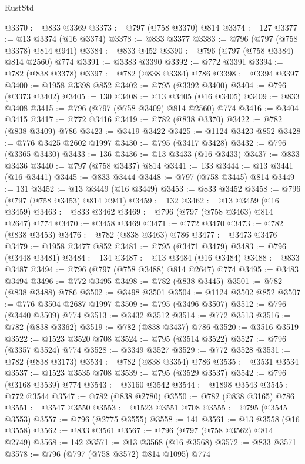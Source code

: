 \begin{lexlean}{RustStd}
\begin{coremodule}
@3370 := @833 @3369
@3373 := @797 (@758 @3370) @814
@3374 := 127
@3377 := @13 @3374 (@16 @3374)
@3378 := @833 @3377
@3383 := @796 (@797 (@758 @3378) @814 @941)
@3384 := @833 @452
@3390 := @796 (@797 (@758 @3384) @814 @2560) @774
@3391 := @3383 @3390
@3392 := @772 @3391
@3394 := @782 (@838 @3378)
@3397 := @782 (@838 @3384) @786
@3398 := @3394 @3397
@3400 := @1958 @3398 @852
@3402 := @795 (@3392 @3400)
@3404 := @796 (@3373 @3402)
@3405 := 130
@3408 := @13 @3405 (@16 @3405)
@3409 := @833 @3408
@3415 := @796 (@797 (@758 @3409) @814 @2560) @774
@3416 := @3404 @3415
@3417 := @772 @3416
@3419 := @782 (@838 @3370)
@3422 := @782 (@838 @3409) @786
@3423 := @3419 @3422
@3425 := @1124 @3423 @852
@3428 := @776 @3425 @2602 @1997
@3430 := @795 (@3417 @3428)
@3432 := @796 (@3365 @3430)
@3433 := 136
@3436 := @13 @3433 (@16 @3433)
@3437 := @833 @3436
@3440 := @797 (@758 @3437) @814
@3441 := 133
@3444 := @13 @3441 (@16 @3441)
@3445 := @833 @3444
@3448 := @797 (@758 @3445) @814
@3449 := 131
@3452 := @13 @3449 (@16 @3449)
@3453 := @833 @3452
@3458 := @796 (@797 (@758 @3453) @814 @941)
@3459 := 132
@3462 := @13 @3459 (@16 @3459)
@3463 := @833 @3462
@3469 := @796 (@797 (@758 @3463) @814 @2647) @774
@3470 := @3458 @3469
@3471 := @772 @3470
@3473 := @782 (@838 @3453)
@3476 := @782 (@838 @3463) @786
@3477 := @3473 @3476
@3479 := @1958 @3477 @852
@3481 := @795 (@3471 @3479)
@3483 := @796 (@3448 @3481)
@3484 := 134
@3487 := @13 @3484 (@16 @3484)
@3488 := @833 @3487
@3494 := @796 (@797 (@758 @3488) @814 @2647) @774
@3495 := @3483 @3494
@3496 := @772 @3495
@3498 := @782 (@838 @3445)
@3501 := @782 (@838 @3488) @786
@3502 := @3498 @3501
@3504 := @1124 @3502 @852
@3507 := @776 @3504 @2687 @1997
@3509 := @795 (@3496 @3507)
@3512 := @796 (@3440 @3509) @774
@3513 := @3432 @3512
@3514 := @772 @3513
@3516 := @782 (@838 @3362)
@3519 := @782 (@838 @3437) @786
@3520 := @3516 @3519
@3522 := @1523 @3520 @708
@3524 := @795 (@3514 @3522)
@3527 := @796 (@3357 @3524) @774
@3528 := @3349 @3527
@3529 := @772 @3528
@3531 := @782 (@838 @3173)
@3534 := @782 (@838 @3354) @786
@3535 := @3531 @3534
@3537 := @1523 @3535 @708
@3539 := @795 (@3529 @3537)
@3542 := @796 (@3168 @3539) @774
@3543 := @3160 @3542
@3544 := @1898 @3543
@3545 := @772 @3544
@3547 := @782 (@838 @2780)
@3550 := @782 (@838 @3165) @786
@3551 := @3547 @3550
@3553 := @1523 @3551 @708
@3555 := @795 (@3545 @3553)
@3557 := @796 (@2775 @3555)
@3558 := 141
@3561 := @13 @3558 (@16 @3558)
@3562 := @833 @3561
@3567 := @796 (@797 (@758 @3562) @814 @2749)
@3568 := 142
@3571 := @13 @3568 (@16 @3568)
@3572 := @833 @3571
@3578 := @796 (@797 (@758 @3572) @814 @1095) @774

\end{coremodule}
\end{lexlean}
